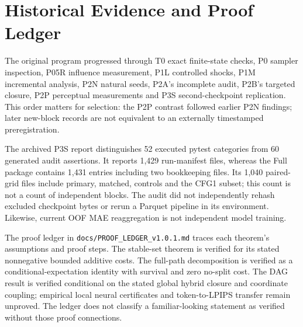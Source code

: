 \documentclass[11pt,a4paper]{article}
\theoremstyle{plain}
\theoremstyle{definition}
\theoremstyle{remark}
\begin{document}
\FloatBarrier
\section{Historical Evidence and Proof Ledger}
The original program progressed through T0 exact finite-state checks, P0 sampler
inspection, P05R influence measurement, P1L controlled shocks, P1M incremental
analysis, P2N natural seeds, P2A's incomplete audit, P2B's targeted closure,
P2P perceptual measurements and P3S second-checkpoint replication. This order
matters for selection: the P2P contrast followed earlier P2N findings; later
new-block records are not equivalent to an externally timestamped preregistration.

The archived P3S report distinguishes 52 executed pytest categories from 60
generated audit assertions. It reports 1,429 run-manifest files, whereas the
Full package contains 1,431 entries including two bookkeeping files. Its 1,040
paired-grid files include primary, matched, controls and the CFG1 subset; this
count is not a count of independent blocks. The audit did not independently
rehash excluded checkpoint bytes or rerun a Parquet pipeline in its environment.
Likewise, current OOF MAE reaggregation is not independent model training.

The proof ledger in \nolinkurl{docs/PROOF_LEDGER_v1.0.1.md} traces each theorem's
assumptions and proof steps. The stable-set theorem is verified for its stated
nonnegative bounded additive costs. The full-path decomposition is verified as
a conditional-expectation identity with survival and zero no-split cost. The
DAG result is verified conditional on the stated global hybrid closure and
coordinate coupling; empirical local neural certificates and token-to-LPIPS
transfer remain unproved. The ledger does not classify a familiar-looking
statement as verified without those proof connections.


\end{document}
